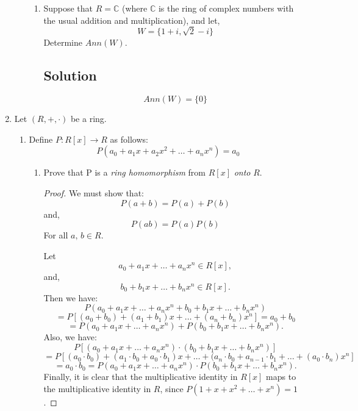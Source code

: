 \documentclass[12pt]{amsart}
\begin{document}
\begin{enumerate}
\begin{enumerate}
\begin{enumerate}

\item Suppose that $R = \mathbb C$ (where $\mathbb C$ is the ring of complex numbers with the usual addition and multiplication), and let,
%
\[ W = \{ 1 + i, \sqrt 2 - i \} \]
%
Determine $Ann(W)$.

\subsection*{Solution}
%
\[ Ann(W) = \{ 0 \} \]
%

\end{enumerate}
\end{enumerate}

\item Let $(R, +, \cdot)$ be a ring.
\begin{enumerate}\setlength{\itemsep}{6pt}
\item Define $P : R[x] \to R$ as follows:
%
\[ P(a_0 + a_1 x + a_2 x^2 + \ldots + a_n x^n) = a_0 \]
%
\begin{enumerate}\setlength{\itemsep}{6pt}
\item Prove that P is a {\it ring homomorphism} from $R[x]$ {\it onto} $R$.

\begin{proof}
We must show that:
%
\[ P(a + b) = P(a) + P(b) \]
%
and,
%
\[ P(ab) = P(a)P(b) \]
%
For all $a,\,b \in R$.

\bigskip

Let
%
\[ a_0 + a_1 x + \ldots + a_n x^n \in R[x], \]
%
and,
%
\[ b_0 + b_1 x + \ldots + b_n x^n \in R[x]. \]
%
Then we have:
%
\[ P(a_0 + a_1 x + \ldots + a_n x^n + b_0 + b_1 x + \ldots + b_n x^n) \]
\[ = P[ (a_0+b_0) + (a_1+b_1)x + \ldots + (a_n + b_n)x^n] = a_0 + b_0 \]
\[ = P(a_0 + a_1 x + \ldots + a_n x^n) + P(b_0 + b_1 x + \ldots + b_n x^n). \]
%
Also, we have:
%
\[ P[ (a_0 + a_1 x + \ldots + a_n x^n) \cdot (b_0 + b_1 x + \ldots + b_n x^n) ] \]
\[ = P[ (a_0\cdot b_0) + (a_1\cdot b_0 + a_0\cdot b_1)x + \ldots + (a_n\cdot b_0 + a_{n-1}\cdot b_1 + \ldots + (a_0\cdot b_n)x^n ] \]
\[ = a_0 \cdot b_0  = P(a_0 + a_1 x + \ldots + a_n x^n) \cdot P(b_0 + b_1 x + \ldots + b_n x^n). \]
%
Finally, it is clear that the multiplicative identity in $R[x]$ maps to the multiplicative identity in $R$, since $P(1 + x + x^2 + \ldots + x^n)=1$.
\end{proof}


\end{enumerate}
\end{enumerate}
\end{enumerate}
\end{document}
